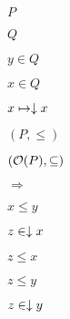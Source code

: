 \documentclass[10pt]{book}
\begin{document}
\begin{mdSnippets}
\begin{mdInlineSnippet}%
$P$\end{mdInlineSnippet}%
\begin{mdInlineSnippet}[f09564c9ca56850d4cd6b3319e541aee]%
$Q$\end{mdInlineSnippet}%
\begin{mdInlineSnippet}[3dc940b6300cd062df7d07398ebafe6d]%
$y \in Q$\end{mdInlineSnippet}%
\begin{mdInlineSnippet}%
$x \in Q$\end{mdInlineSnippet}%
\begin{mdInlineSnippet}[675c87825169038cf88df5fadba261f8]%
$x \mapsto \downarrow x$\end{mdInlineSnippet}%
\begin{mdInlineSnippet}[16b6b1887ae49fc4060efd7329328e6b]%
$(P, \leq)$\end{mdInlineSnippet}%
\begin{mdInlineSnippet}[13de90b1b6cf6ba850aa24cfb58227ae]%
$(\mathcal{O}(P), \subseteq)$\end{mdInlineSnippet}%
\begin{mdInlineSnippet}[055889aaee38b7c53f994c5e42a40994]%
$\Rightarrow$\end{mdInlineSnippet}%
\begin{mdInlineSnippet}[a06b941ca6029ffd3ef8c0653b7e280e]%
$x \leq y$\end{mdInlineSnippet}%
\begin{mdInlineSnippet}[e61b0e1e5e147536cd7f8820d8735ec3]%
$z \in \downarrow x$\end{mdInlineSnippet}%
\begin{mdInlineSnippet}[697357435a3d818d87cf8af1e5889ee4]%
$z \leq x$\end{mdInlineSnippet}%
\begin{mdInlineSnippet}[99d2c121ceff4df4419115ac7cb82785]%
$z \leq y$\end{mdInlineSnippet}%
\begin{mdInlineSnippet}[169431cfa84b3744e25c0d6ce1272d8d]%
$z \in \downarrow y$\end{mdInlineSnippet}%

\end{mdSnippets}
\end{document}
